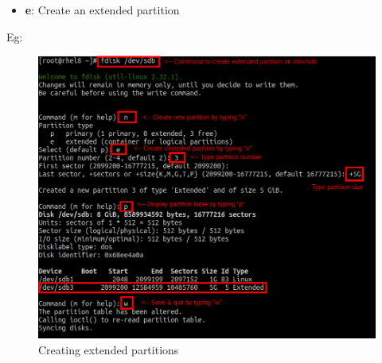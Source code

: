 \begin{flushleft}
\bigskip

\begin{itemize}
	\item \textbf{e}: Create an extended partition
\end{itemize}



Eg:
\begin{figure}[h!]
	\centering
	\includegraphics[scale=.4]{content/chapter8/images/extended_primary.png}
	\caption{Creating extended partitions}
	\label{primary_extended}
\end{figure}		
	
\end{flushleft}

\newpage

